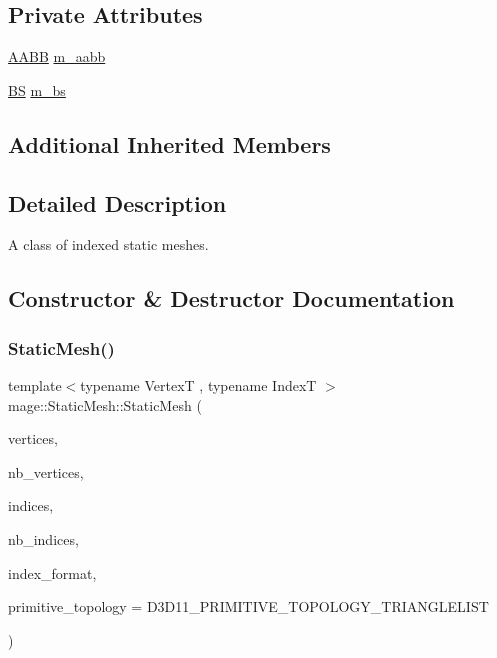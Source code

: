 \subsection*{Private Attributes}
\begin{DoxyCompactItemize}
\item 
\hyperlink{structmage_1_1_a_a_b_b}{A\+A\+BB} \hyperlink{classmage_1_1_static_mesh_ae295e5ab8242dd6464c71eda10ca2f85}{m\+\_\+aabb}
\item 
\hyperlink{structmage_1_1_b_s}{BS} \hyperlink{classmage_1_1_static_mesh_ae5a9d7c89d7253130329d7b482045c8f}{m\+\_\+bs}
\end{DoxyCompactItemize}
\subsection*{Additional Inherited Members}


\subsection{Detailed Description}
A class of indexed static meshes. 

\subsection{Constructor \& Destructor Documentation}
\hypertarget{classmage_1_1_static_mesh_ad1fb729eb4549c46f357d639127f9724}{}\label{classmage_1_1_static_mesh_ad1fb729eb4549c46f357d639127f9724} 
\subsubsection{\texorpdfstring{Static\+Mesh()}{StaticMesh()}\hspace{0.1cm}{\footnotesize\ttfamily [1/6]}}
{\footnotesize\ttfamily template$<$typename VertexT , typename IndexT $>$ \\
mage\+::\+Static\+Mesh\+::\+Static\+Mesh (\begin{DoxyParamCaption}\item[{const VertexT $\ast$}]{vertices,  }\item[{size\+\_\+t}]{nb\+\_\+vertices,  }\item[{const IndexT $\ast$}]{indices,  }\item[{size\+\_\+t}]{nb\+\_\+indices,  }\item[{D\+X\+G\+I\+\_\+\+F\+O\+R\+M\+AT}]{index\+\_\+format,  }\item[{D3\+D11\+\_\+\+P\+R\+I\+M\+I\+T\+I\+V\+E\+\_\+\+T\+O\+P\+O\+L\+O\+GY}]{primitive\+\_\+topology = {\ttfamily D3D11\+\_\+PRIMITIVE\+\_\+TOPOLOGY\+\_\+TRIANGLELIST} }\end{DoxyParamCaption})\hspace{0.3cm}{\ttfamily [explicit]}}


